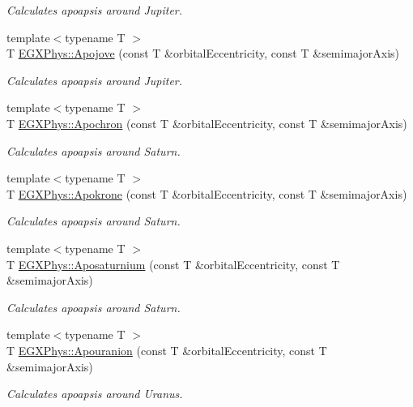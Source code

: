 \begin{DoxyCompactItemize}
\begin{DoxyCompactList}\small\item\em Calculates apoapsis around Jupiter. \end{DoxyCompactList}\item 
{\footnotesize template$<$typename T $>$ }\\T \hyperlink{group___apoapsis_ga5a45d0a873514113aaa0adc95aefbbde}{E\+G\+X\+Phys\+::\+Apojove} (const T \&orbital\+Eccentricity, const T \&semimajor\+Axis)
\begin{DoxyCompactList}\small\item\em Calculates apoapsis around Jupiter. \end{DoxyCompactList}\item 
{\footnotesize template$<$typename T $>$ }\\T \hyperlink{group___apoapsis_gae4ea146039e6f32022321f0998e715e8}{E\+G\+X\+Phys\+::\+Apochron} (const T \&orbital\+Eccentricity, const T \&semimajor\+Axis)
\begin{DoxyCompactList}\small\item\em Calculates apoapsis around Saturn. \end{DoxyCompactList}\item 
{\footnotesize template$<$typename T $>$ }\\T \hyperlink{group___apoapsis_ga98557a8d49aa129c29e652c4758334d1}{E\+G\+X\+Phys\+::\+Apokrone} (const T \&orbital\+Eccentricity, const T \&semimajor\+Axis)
\begin{DoxyCompactList}\small\item\em Calculates apoapsis around Saturn. \end{DoxyCompactList}\item 
{\footnotesize template$<$typename T $>$ }\\T \hyperlink{group___apoapsis_gac157adc20a88c8616e4822eb819f9016}{E\+G\+X\+Phys\+::\+Aposaturnium} (const T \&orbital\+Eccentricity, const T \&semimajor\+Axis)
\begin{DoxyCompactList}\small\item\em Calculates apoapsis around Saturn. \end{DoxyCompactList}\item 
{\footnotesize template$<$typename T $>$ }\\T \hyperlink{group___apoapsis_ga6efaf5c9379f1085fa6e51bf97356124}{E\+G\+X\+Phys\+::\+Apouranion} (const T \&orbital\+Eccentricity, const T \&semimajor\+Axis)
\begin{DoxyCompactList}\small\item\em Calculates apoapsis around Uranus. \end{DoxyCompactList}\item 

\end{DoxyCompactItemize}
